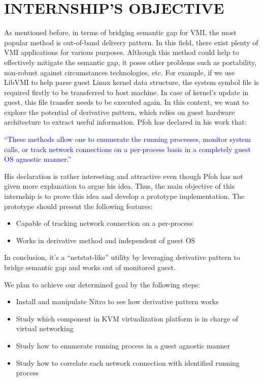 
\chapter{INTERNSHIP’S OBJECTIVE} %

\label{Chapter3} %


As mentioned before, in terms of bridging semantic gap for VMI, the most popular method is out-of-band delivery pattern. In this field, there 
exist plenty of VMI applications for various purposes. Although this method could help to effectively mitigate the semantic gap, it poses other 
problems such as portability, non-robust against circumstances technologies, etc. For example, if we use LibVMI to help parse guest Linux kernel
data structure, the system symbol file is required firstly to be transferred to host machine. In case of kernel’s update in guest, this file 
transfer needs to be executed again. In this context, we want to explore the potential of derivative pattern, which relies on guest hardware 
architecture to extract useful information. Pfoh has declared in his work \cite{Reference7} that:

\textcolor{blue}{
  “These methods allow one to enumerate the running processes, monitor system calls, or track network connections 
  on a per-process basis in a completely guest OS agnostic manner.” 
}

His declaration is rather interesting and attractive even though Pfoh has not given more explanation to argue his idea. Thus, the main objective
of this internship is to prove this idea and develop a prototype implementation. The prototype should present the following features:

\begin{itemize}
    \item Capable of tracking network connection on a per-process
    \item Works in derivative method and independent of guest OS
 \end{itemize}

In conclusion, it’s a “netstat-like” utility by leveraging derivative pattern to bridge semantic gap and works out of monitored guest.

We plan to achieve our determined goal by the following steps:

\begin{itemize}
    \item Install and manipulate Nitro to see how derivative pattern works
    \item Study which component in KVM virtualization platform is in charge of virtual networking
    \item Study how to enumerate running process in a guest agnostic manner
    \item Study how to correlate each network connection with identified running process 
 \end{itemize}
